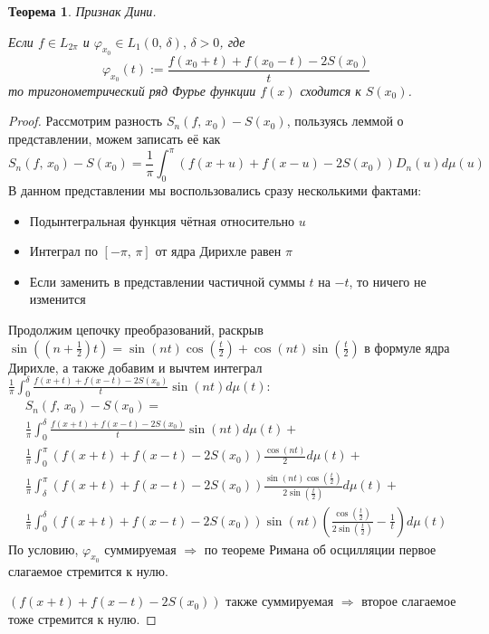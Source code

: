 \documentclass[a4paper,12pt]{article}
\renewcommand{\phi}{\ensuremath{\varphi}}
\theoremstyle{plain}
\newtheorem{theorem}{Теорема}[section]
\theoremstyle{definition}
\theoremstyle{remark}
\begin{document}
\begin{theorem}
	Признак Дини.

	Если $f \in L_{2\pi}$ и $\phi_{x_0} \in L_1(0,\,\delta),\, \delta > 0$, где
	\[\phi_{x_0}(t) := \frac{f(x_0 + t) + f(x_0 - t) - 2S(x_0)}{t}\]
	то тригонометрический ряд Фурье функции $f(x)$ сходится к $S(x_0)$.
\end{theorem}

\begin{proof}
	Рассмотрим разность $S_n(f,\,x_0) - S(x_0)$, пользуясь леммой о представлении, можем записать её как
	\[S_n(f,\,x_0) - S(x_0) = \frac{1}{\pi}\int_{0}^\pi (f(x + u) + f(x - u) - 2S(x_0)) D_n(u)d\mu(u)\]
	В данном представлении мы воспользовались сразу несколькими фактами:
	\begin{itemize}
		\item Подынтегральная функция чётная относительно $u$
		\item Интеграл по $[-\pi,\,\pi]$ от ядра Дирихле равен $\pi$
		\item Если заменить в представлении частичной суммы $t$ на $-t$, то ничего не изменится
	\end{itemize}
	Продолжим цепочку преобразований, раскрыв $\sin((n + \frac{1}{2})t) = \sin(nt)\cos(\frac{t}{2}) + \cos(nt)\sin(\frac{t}{2})$ в формуле ядра Дирихле, а также добавим и вычтем интеграл $\frac{1}{\pi} \int_0^\delta \frac{f(x + t) + f(x - t) - 2S(x_0)}{t} \sin(nt)d\mu(t)$:
	\begin{align*}
		S_n(f,\,x_0) - S(x_0) =                                                                                                   \\
		\frac{1}{\pi} \int_0^\delta \frac{f(x + t) + f(x - t) - 2S(x_0)}{t} \sin(nt)d\mu(t) +                                     \\
		\frac{1}{\pi}\int_0^\pi (f(x + t) + f(x - t) - 2S(x_0))\frac{\cos(nt)}{2}d\mu(t) +                                        \\
		\frac{1}{\pi}\int_\delta^\pi (f(x + t) + f(x - t) - 2S(x_0))\frac{\sin(nt)\cos(\frac{t}{2})}{2\sin(\frac{t}{2})}d\mu(t) + \\
		\frac{1}{\pi}\int_0^\delta (f(x + t) + f(x - t) - 2S(x_0))\sin(nt) \left(\frac{\cos(\frac{t}{2})}{2\sin(\frac{t}{2})} - \frac{1}{t}\right)d\mu(t)
	\end{align*}
	По условию, $\phi_{x_0}$ суммируемая $\Rightarrow$ по теореме Римана об осцилляции первое слагаемое стремится к нулю.

	$(f(x + t) + f(x-t) - 2S(x_0))$ также суммируемая $\Rightarrow$ второе слагаемое тоже стремится к нулю.


\end{proof}
\end{document}
